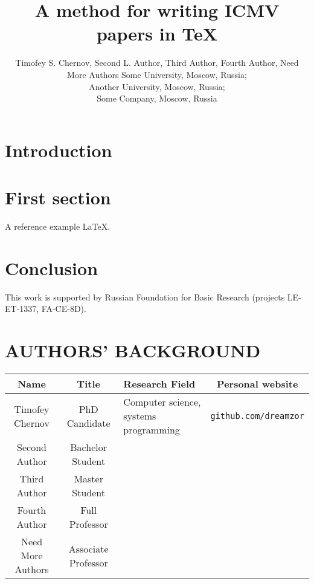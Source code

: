 \documentclass{spie}
\title{A method for writing ICMV papers in TeX}
\author{Timofey S. Chernov\supit{1,3}, Second L. Author\supit{2}, Third Author\supit{3}, 		
        \skiplinehalf
        Fourth Author\supit{1,2}, Need More Authors\supit{1,2,3}
  \skiplinehalf
  \normalsize 
  \supit{1}Some University, Moscow, Russia; \\
  \supit{2}Another University, Moscow, Russia; \\
  \supit{3}Some Company, Moscow, Russia
}
\begin{document}
\maketitle

\begin{abstract}
  \lipsum[6]
  
\end{abstract}

\section{Introduction}

\lipsum[1]

\section{First section}

A reference example \LaTeX \cite{fourier_applications}.

\section{Conclusion}

\lipsum[42]

\acknowledgements

This work is supported by Russian Foundation for Basic Research (projects LE-ET-1337, FA-CE-8D). 





\clearpage

\section*{AUTHORS' BACKGROUND}

\begin{table}[h]
	\centering
	\begin{tabular}{ | c | c | p{45mm} | c | } \hline
		Name & Title & \centering Research Field & Personal website \\
		\hline
		Timofey Chernov & PhD Candidate & Computer science, systems programming & \texttt{github.com/dreamzor} \\
		\hline
		Second Author & Bachelor Student &  & \\
 		\hline
 		Third Author & Master Student &  & \\
 		\hline
 		Fourth Author & Full Professor &  & \\
  	\hline
 		Need More Authors & Associate Professor &  & \\
		\hline
	\end{tabular}
\end{table}
\end{document}
